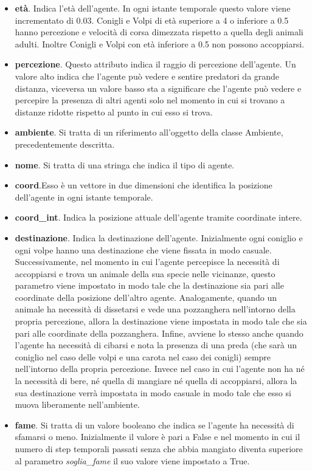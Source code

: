 \documentclass[11pt]{article}
\begin{document}
\begin{itemize}
    \item \textbf{età}. Indica l'età dell'agente. In ogni istante temporale questo valore viene incrementato di 0.03. Conigli e Volpi di età superiore a 4 o inferiore a 0.5 hanno percezione e velocità di corsa dimezzata rispetto a quella degli animali adulti. Inoltre Conigli e Volpi con età inferiore a 0.5 non possono accoppiarsi. 
    \item \textbf{percezione}. Questo attributo indica il raggio di percezione dell'agente. Un valore alto indica che l'agente può vedere e sentire predatori da grande distanza, viceversa un valore basso sta a significare che l'agente può vedere e percepire la presenza di altri agenti solo nel momento in cui si trovano a distanze ridotte rispetto al punto in cui esso si trova. 
    \item \textbf{ambiente}. Si tratta di un riferimento all'oggetto della classe Ambiente, precedentemente descritta. 
    \item \textbf{nome}. Si tratta di una stringa che indica il tipo di agente. 
    \item \textbf{coord}.Esso è un vettore in due dimensioni che identifica la posizione dell'agente in ogni istante temporale. 
    \item \textbf{coord\_int}. Indica la posizione attuale dell'agente tramite coordinate intere.
    \item \textbf{destinazione}. Indica la destinazione dell'agente. Inizialmente ogni coniglio e ogni volpe hanno una destinazione che viene fissata in modo casuale. Successivamente, nel momento in cui l'agente percepisce la necessità di accoppiarsi e trova un animale della sua specie nelle vicinanze, questo parametro viene impostato in modo tale che la destinazione sia pari alle coordinate della posizione dell'altro agente. Analogamente, quando un animale ha necessità di dissetarsi e vede una pozzanghera nell'intorno della propria percezione, allora la destinazione viene impostata in modo tale che sia pari alle coordinate della pozzanghera. Infine, avviene lo stesso anche quando l'agente ha necessità di cibarsi e nota la presenza di una preda (che sarà un coniglio nel caso delle volpi e una carota nel caso dei conigli) sempre nell'intorno della propria percezione. 
    Invece nel caso in cui l'agente non ha né la necessità di bere, né quella di mangiare né quella di accoppiarsi, allora la sua destinazione verrà impostata in modo casuale in modo tale che esso si muova liberamente nell'ambiente. 
    \item \textbf{fame}. Si tratta di un valore booleano che indica se l'agente ha necessità di sfamarsi o meno. Inizialmente il valore è pari a False e nel momento in cui il numero di step temporali passati senza che abbia mangiato diventa superiore al parametro \emph{soglia\_fame} il suo valore viene impostato a True. 

\end{itemize}
\end{document}
